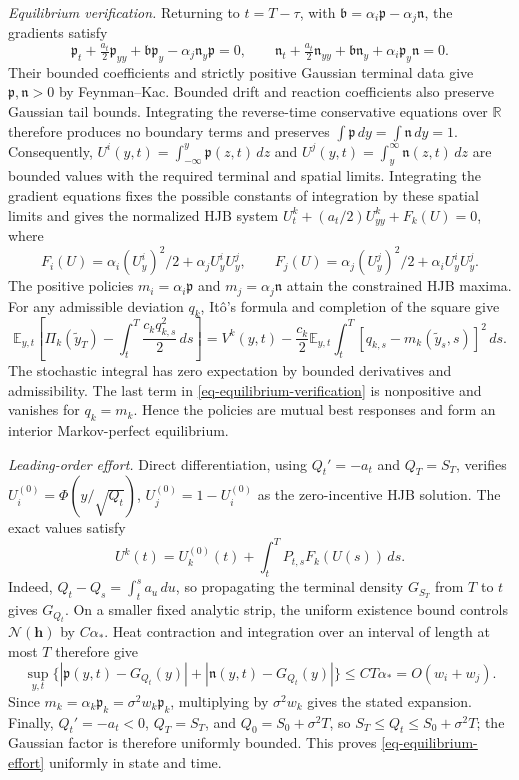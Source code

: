 \documentclass[mnsc]{informs3}
\begin{document}
\begin{APPENDICES}
{{\emph{Equilibrium verification.}
Returning to $t=T-\tau$, with $\mathfrak b=\alpha_i{\mathfrak p}-\alpha_j{\mathfrak n}$,
the gradients satisfy
\[
{\mathfrak p}_t+\tfrac{a_t}2{\mathfrak p}_{yy}+\mathfrak b{\mathfrak p}_y-\alpha_j{\mathfrak n}_y{\mathfrak p}=0,\qquad
{\mathfrak n}_t+\tfrac{a_t}2{\mathfrak n}_{yy}+\mathfrak b{\mathfrak n}_y+\alpha_i{\mathfrak p}_y{\mathfrak n}=0.
\]
Their bounded coefficients and strictly positive Gaussian terminal data
give ${\mathfrak p},{\mathfrak n}>0$ by Feynman--Kac. Bounded drift and reaction
coefficients also preserve Gaussian tail bounds. Integrating the
reverse-time conservative equations over $\mathbb R$ therefore produces
no boundary terms and preserves $\int {\mathfrak p}\,dy=\int {\mathfrak n}\,dy=1$.
Consequently,
$U^i(y,t)=\int_{-\infty}^y{\mathfrak p}(z,t)\,dz$ and
$U^j(y,t)=\int_y^\infty {\mathfrak n}(z,t)\,dz$
are bounded values with the required terminal and spatial limits.
Integrating the gradient equations fixes the possible constants of
integration by these spatial limits and gives the normalized HJB system
$U_t^k+(a_t/2)U_{yy}^k+F_k(U)=0$, where
\[
F_i(U)=\alpha_i(U_y^i)^2/2+\alpha_jU_y^iU_y^j,\qquad
F_j(U)=\alpha_j(U_y^j)^2/2+\alpha_iU_y^iU_y^j.
\]
The positive policies $m_i=\alpha_i{\mathfrak p}$ and $m_j=\alpha_j{\mathfrak n}$ attain
the constrained HJB maxima. For any admissible deviation $q_k$,
It\^o's formula and completion of the square give
\begin{equation}\label{eq-equilibrium-verification}
\mathbb E_{y,t}\!\left[\Pi_k(\tilde y_T)-\int_t^T
\frac{c_kq_{k,s}^2}{2}\,ds\right]
=V^k(y,t)-\frac{c_k}{2}\mathbb E_{y,t}\!\int_t^T
[q_{k,s}-m_k(\tilde y_s,s)]^2\,ds.
\end{equation}
The stochastic integral has zero expectation by bounded derivatives
and admissibility.
The last term in \eqref{eq-equilibrium-verification} is nonpositive and
vanishes for $q_k=m_k$. Hence the policies are mutual best responses and
form an interior Markov-perfect equilibrium.

\emph{Leading-order effort.}
Direct differentiation, using $Q_t'=-a_t$ and $Q_T=S_T$, verifies
$U_i^{(0)}=\Phi(y/\sqrt{Q_t})$, $U_j^{(0)}=1-U_i^{(0)}$
as the zero-incentive HJB solution. The exact values satisfy
\begin{equation}\label{eq-equilibrium-fixed-point}
U^k(t)=U_k^{(0)}(t)+\int_t^T P_{t,s}F_k(U(s))\,ds.
\end{equation}
Indeed, $Q_t-Q_s=\int_t^sa_u\,du$, so propagating the terminal density
$G_{S_T}$ from $T$ to $t$ gives $G_{Q_t}$. On a smaller fixed analytic
strip, the uniform existence bound controls $\mathscr N({\mathbf h})$ by
$C\alpha_*$. Heat contraction and integration over an interval of length
at most $T$ therefore give
\[
\sup_{y,t}\{|{\mathfrak p}(y,t)-G_{Q_t}(y)|+|{\mathfrak n}(y,t)-G_{Q_t}(y)|\}
\leq CT\alpha_*=O(w_i+w_j).
\]
Since $m_k=\alpha_k{\mathfrak p}_k=\sigma^2w_k{\mathfrak p}_k$, multiplying by
$\sigma^2w_k$ gives the stated expansion. Finally,
$Q_t'=-a_t<0$, $Q_T=S_T$, and $Q_0=S_0+\sigma^2T$, so
$S_T\leq Q_t\leq S_0+\sigma^2T$; the Gaussian factor is therefore
uniformly bounded. This proves \eqref{eq-equilibrium-effort} uniformly
in state and time.
\Halmos
\endproof
}
}


\end{APPENDICES}
\end{document}
